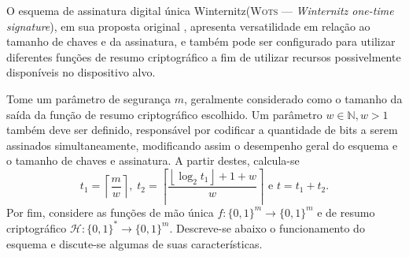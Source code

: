 \documentclass{article}
\newcommand{\binwds}[1]{\{0, 1\}^{#1}}
\begin{document}
O esquema de assinatura digital única Winternitz(\textsc{Wots} --- \emph{Winternitz one-time signature}), em sua proposta original \cite{Merkle:1989:CDS:118209.118230},
apresenta versatilidade em relação ao tamanho de chaves e da assinatura, e também pode
ser configurado para utilizar diferentes funções de resumo criptográfico a fim de
utilizar recursos possivelmente disponíveis no dispositivo alvo.

Tome um parâmetro de segurança $m$, geralmente considerado como
o tamanho da saída da função de resumo criptográfico escolhido. Um parâmetro
$w \in \mathbb{N}, w > 1$ também deve ser definido, responsável por codificar a
quantidade de bits a serem assinados simultaneamente, modificando assim o
desempenho geral do esquema e o tamanho de chaves e assinatura. A partir destes,
calcula-se
    $$t_1 = \left\lceil \frac{m}{w} \right\rceil, \; t_2 = \left\lceil 
    \frac{\left\lfloor \log_2 t_1 \right\rfloor + 1 + w}{w} \right\rceil \text{ e }
    t = t_1 + t_2.$$
Por fim, considere as funções de mão única
$f : \binwds{m} \longrightarrow \binwds{m}$
e de resumo criptográfico
$\mathcal{H} : \binwds{*} \longrightarrow \binwds{m}$.
Descreve-se abaixo o funcionamento do esquema
e discute-se algumas de suas características. 
\end{document}
